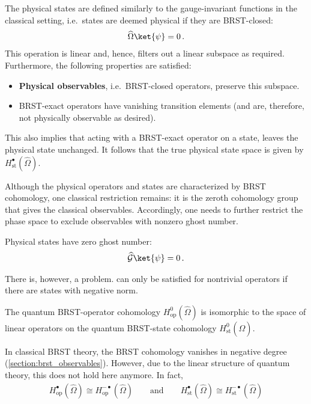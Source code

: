     \begin{axiom}
        The physical states are defined similarly to the gauge-invariant functions in the classical setting, i.e.~states are deemed physical if they are BRST-closed:
        \begin{gather}
            \widehat{\Omega}\ket{\psi} = 0\,.
        \end{gather}
        This operation is linear and, hence, filters out a linear subspace as required. Furthermore, the following properties are satisfied:
        \begin{itemize}
            \item \textbf{Physical observables}, i.e.~BRST-closed operators, preserve this subspace.
            \item BRST-exact operators have vanishing transition elements (and are, therefore, not physically observable as desired).
        \end{itemize}
        This also implies that acting with a BRST-exact operator on a state, leaves the physical state unchanged. It follows that the true physical state space is given by $H_{\text{st}}^\bullet(\widehat{\Omega})$.
    \end{axiom}

    Although the physical operators and states are characterized by BRST cohomology, one classical restriction remains: it is the zeroth cohomology group that gives the classical observables. Accordingly, one needs to further restrict the phase space to exclude observables with nonzero ghost number.
    \begin{axiom}
        Physical states have zero ghost number:
        \begin{gather}
            \widehat{\mathcal{G}}\ket{\psi} = 0\,.
        \end{gather}
    \end{axiom}

    There is, however, a problem.  can only be satisfied for nontrivial operators if there are states with negative norm.

    \begin{property}
        The quantum BRST-operator cohomology $H^0_{\text{op}}(\widehat{\Omega})$ is isomorphic to the space of linear operators on the quantum BRST-state cohomology $H^0_{\text{st}}(\widehat{\Omega})$.
    \end{property}

    \begin{property}[Duality]
        In classical BRST theory, the BRST cohomology vanishes in negative degree (\cref{section:brst_observables}). However, due to the linear structure of quantum theory, this does not hold here anymore. In fact, 
        \begin{gather}
            H^\bullet_{\text{op}}(\widehat{\Omega})\cong H^{-\bullet}_{\text{op}}(\widehat{\Omega}) \qquad\text{and}\qquad H^\bullet_{\text{st}}(\widehat{\Omega})\cong H^{-\bullet}_{\text{st}}(\widehat{\Omega})
        \end{gather}
    \end{property}

